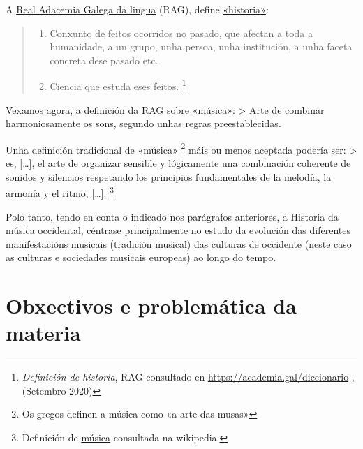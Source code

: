 \documentclass[a4paper, twoside]{templates/ociamthesis}
\begin{document}
A \href{https://academia.gal/dicionario}{Real Adacemia Galega da lingua} (RAG), define \href{https://academia.gal/dicionario/-/termo/busca/Historia}{«historia»}:

\begin{quote}
\begin{enumerate}
\def\labelenumi{\arabic{enumi}.}
\item
  Conxunto de feitos ocorridos no pasado, que afectan a toda a humanidade, a un grupo, unha persoa, unha institución, a unha faceta concreta dese pasado etc.
\item
  Ciencia que estuda eses feitos. \footnote{\emph{Definición de historia}, RAG consultado en \url{https://academia.gal/diccionario} , (Setembro 2020)}
\end{enumerate}
\end{quote}

Vexamos agora, a definición da RAG sobre \href{https://digalego.xunta.gal/es/termo/44501/m\%C3\%BAsica}{«música»}:
\textgreater{} Arte de combinar harmoniosamente os sons, segundo unhas regras preestablecidas.

Unha definición tradicional de «música» \footnote{Os gregos definen a música como «a arte das musas»} máis ou menos aceptada podería ser:
\textgreater{} es, {[}\ldots{]}, el \href{https://es.wikipedia.org/wiki/Arte}{arte} de organizar sensible y lógicamente una combinación coherente de \href{https://es.wikipedia.org/wiki/Sonido}{sonidos} y \href{https://es.wikipedia.org/wiki/Silencio_(sonido)}{silencios} respetando los principios fundamentales de la \href{https://es.wikipedia.org/wiki/Melodía}{melodía}, la \href{https://es.wikipedia.org/wiki/Armonía}{armonía} y el \href{https://es.wikipedia.org/wiki/Ritmo}{ritmo}, {[}\ldots{]}. \footnote{Definición de \href{https://es.wikipedia.org/wiki/M\%C3\%BAsica\#Definici\%C3\%B3n}{música} consultada na wikipedia.}

\begin{correction}
Polo tanto, tendo en conta o indicado nos parágrafos anteriores, a
Historia da música occidental, céntrase principalmente no estudo da
evolución das diferentes manifestacións musicais (tradición musical) das
culturas de occidente (neste caso as culturas e sociedades musicais
europeas) ao longo do tempo.
\end{correction}

\hypertarget{obxectivos-e-problemuxe1tica-da-materia}{%
\section*{Obxectivos e problemática da materia}\label{obxectivos-e-problemuxe1tica-da-materia}}
\end{document}
